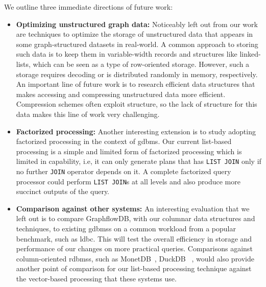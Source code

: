 We outline three immediate directions of future work:
\begin{itemize}
	\item \textbf{Optimizing unstructured graph data:} Noticeably left out from our work are techniques to optimize the storage of unstructured data that appears in some graph-structured datasets in real-world. A common approach to storing such data is to keep them in variable-width records and structures like linked-lists, which can be seen as a type of row-oriented storage. However, such a storage requires decoding or is distributed randomly in memory, respectively. An important line of future work is to research efficient data structures that makes accessing and compressing unstructured data more efficient. Compression schemes often exploit structure, so the lack of structure for this data makes this line of work very challenging. %
	
	\item \textbf{Factorized processing:} Another interesting extension is to study adopting factorized processing in the context of \gls{gdbms}. Our current list-based processing is a simple and limited form of factorized processing which is limited in capability, i.e, it can only generate plans that has \texttt{LIST JOIN} only if no further \texttt{JOIN} operator depends on it. A complete factorized query processor could perform \texttt{LIST JOIN}s at all levels and also produce more succinct outputs of the query.
	
	\item \textbf{Comparison against other systems: }An interesting evaluation that we left out is to compare GraphflowDB, with our columnar data structures and techniques, to existing \gls{gdbms}s on a common workload from a popular benchmark, such as \gls{ldbc}. This will test the overall efficiency in storage and performance of our changes on more practical queries. Comparisons against column-oriented \gls{rdbms}s, such as MonetDB~\cite{monetdb}, DuckDB~\cite{duckdb} , would also provide another point of comparison for our list-based processing technique against the vector-based processing that these systems use. 
	
\end{itemize}

